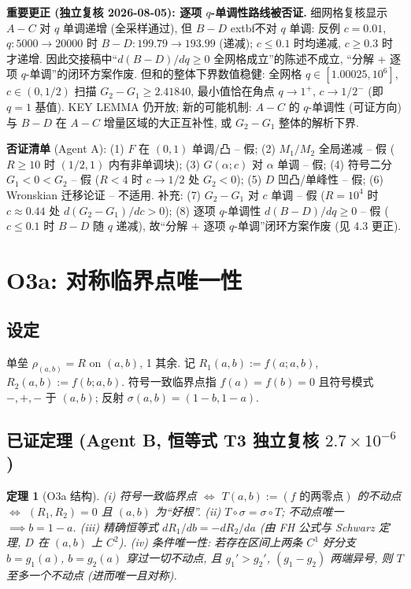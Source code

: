 \documentclass[UTF8]{ctexart}
\newtheorem{theorem}{定理}[section]
\begin{document}
\textbf{重要更正 (独立复核 2026-08-05): 逐项 $q$-单调性路线被否证.} 细网格复核显示 $A-C$ 对 $q$ 单调递增 (全采样通过), 但 $B-D$ 	extbf{不}对 $q$ 单调:
反例 $c=0.01$, $q\colon 5000\to20000$ 时 $B-D\colon 199.79\to193.99$ (递减); $c\le0.1$ 时均递减, $c\ge0.3$ 时才递增. 因此交接稿中``$d(B-D)/dq\ge0$ 全网格成立''的陈述不成立, ``分解 + 逐项 $q$-单调''的闭环方案作废. 但和的整体下界数值稳健: 全网格 $q\in[1.00025,10^6]$, $c\in(0,1/2)$ 扫描
$G_2-G_1 \ge 2.41840$, 最小值恰在角点 $q\to1^+$, $c\to1/2^-$ (即 $q=1$ 基值). KEY LEMMA 仍开放; 新的可能机制: $A-C$ 的 $q$-单调性 (可证方向) 与 $B-D$ 在
$A-C$ 增量区域的大正互补性, 或 $G_2-G_1$ 整体的解析下界.

\textbf{否证清单} (Agent A): (1) $F$ 在 $(0,1)$ 单调/凸 -- 假;
(2) $M_1/M_2$ 全局递减 -- 假 ($R\ge10$ 时 $(1/2,1)$ 内有非单调块);
(3) $G(\alpha;c)$ 对 $\alpha$ 单调 -- 假; (4) 符号二分 $G_1<0<G_2$ --
假 ($R<4$ 时 $c\to1/2$ 处 $G_2<0$); (5) $D$ 凹凸/单峰性 -- 假;
(6) Wronskian 迁移论证 -- 不适用. 补充: (7) $G_2-G_1$ 对 $c$ 单调 -- 假
($R=10^4$ 时 $c\approx0.44$ 处 $d(G_2-G_1)/dc > 0$);
(8) 逐项 $q$-单调性 $d(B-D)/dq\ge0$ -- 假 ($c\le0.1$ 时 $B-D$ 随 $q$ 递减),
故``分解 + 逐项 $q$-单调''闭环方案作废 (见 4.3 更正).

\section{O3a: 对称临界点唯一性}

\subsection{设定}

单垒 $\rho_{(a,b)} = R$ on $(a,b)$, 1 其余. 记
$R_1(a,b):=f(a;a,b)$, $R_2(a,b):=f(b;a,b)$. 符号一致临界点指
$f(a)=f(b)=0$ 且符号模式 $-,+,-$ 于 $(a,b)$; 反射 $\sigma(a,b)=(1-b,1-a)$.

\subsection{已证定理 (Agent B, 恒等式 T3 独立复核 \texorpdfstring{$2.7\times10^{-6}$}{2.7e-6})}

\begin{theorem}[O3a 结构]
(i) 符号一致临界点 $\iff$ $T(a,b):=(f\text{ 的两零点})$ 的不动点
$\iff$ $(R_1,R_2)=0$ 且 $(a,b)$ 为``好根''.
(ii) $T\circ\sigma = \sigma\circ T$; 不动点唯一 $\implies b=1-a$.
(iii) 精确恒等式 $dR_1/db = -dR_2/da$ (由 FH 公式与 Schwarz 定理,
$D$ 在 $(a,b)$ 上 $C^2$).
(iv) 条件唯一性: 若存在区间上两条 $C^1$ 好分支
$b=g_1(a)$, $b=g_2(a)$ 穿过一切不动点, 且 $g_1' > g_2'$,
$(g_1-g_2)$ 两端异号, 则 $T$ 至多一个不动点 (进而唯一且对称).
\end{theorem}
\end{document}
